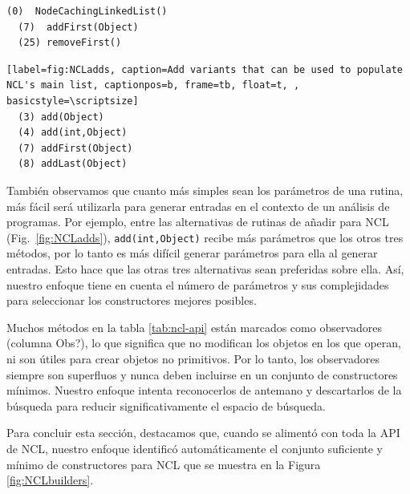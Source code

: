 \begin{lstlisting}[label=fig:NCLbuilders, caption=A sufficient set of builders for NCL, captionpos=b, frame=tb, float=t, basicstyle=\scriptsize]
  (0)  NodeCachingLinkedList()
  (7)  addFirst(Object)
  (25) removeFirst()
\end{lstlisting}

\begin{lstlisting}[label=fig:NCLadds, caption=Add variants that can be used to populate NCL's main list, captionpos=b, frame=tb, float=t, , basicstyle=\scriptsize]
  (3) add(Object)
  (4) add(int,Object)
  (7) addFirst(Object)
  (8) addLast(Object)
\end{lstlisting}


También observamos que cuanto más simples sean los parámetros de una rutina, más fácil será utilizarla para generar entradas en el contexto de un análisis de programas. Por ejemplo, entre las alternativas de rutinas de añadir para NCL (Fig.~\ref{fig:NCLadds}), \texttt{add(int,Object)} recibe más parámetros que los otros tres métodos, por lo tanto es más difícil generar parámetros para ella al generar entradas. Esto hace que las otras tres alternativas sean preferidas sobre ella. Así, nuestro enfoque tiene en cuenta el número de parámetros y sus complejidades para seleccionar los constructores mejores posibles.

Muchos métodos en la tabla \ref{tab:ncl-api} están marcados como observadores (columna Obs?), lo que significa que no modifican los objetos en los que operan, ni son útiles para crear objetos no primitivos. Por lo tanto, los observadores siempre son superfluos y nunca deben incluirse en un conjunto de constructores mínimos. Nuestro enfoque intenta reconocerlos de antemano y descartarlos de la búsqueda para reducir significativamente el espacio de búsqueda.

Para concluir esta sección, destacamos que, cuando se alimentó con toda la API de NCL, nuestro enfoque identificó automáticamente el conjunto suficiente y mínimo de constructores para NCL que se muestra en la Figura \ref{fig:NCLbuilders}.

